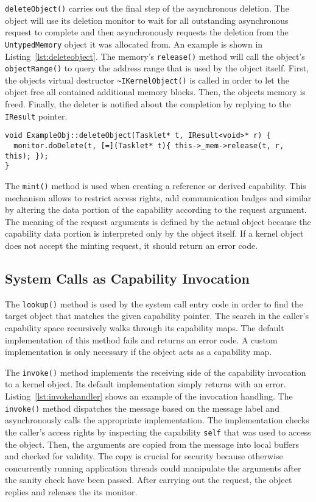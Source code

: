 \texttt{deleteObject()} carries out the final step of the asynchronous
deletion. The object will use its deletion monitor to wait for all
outstanding asynchronous request to complete and then asynchronously
requests the deletion from the \texttt{UntypedMemory} object it was
allocated from. An example is shown in
Listing~\ref{lst:deleteobject}. The memory's \texttt{release()} method
will call the object's \texttt{objectRange()} to query the address
range that is used by the object itself. First, the objects virtual
destructor \texttt{\textasciitilde IKernelObject()} is called in order to let the
object free all contained additional memory blocks. Then, the objects
memory is freed. Finally, the deleter is notified about the completion
by replying to the \texttt{IResult} pointer.

\begin{lstlisting}[float, label=lst:deleteobject, caption=Example handler for asynchronous object deletion.]
void ExampleObj::deleteObject(Tasklet* t, IResult<void>* r) {
  monitor.doDelete(t, [=](Tasklet* t){ this->_mem->release(t, r, this); });
}
\end{lstlisting}

The \texttt{mint()} method is used when creating a reference or derived capability. This mechanism allows to restrict access rights, add communication badges and similar by altering the data portion of the capability according to the request argument. The meaning of the request arguments is defined by the actual object because the capability data portion is interpreted only by the object itself. If a kernel object does not accept the minting request, it should return an error code.

\subsection{System Calls as Capability Invocation}

The \texttt{lookup()} method is used by the system call entry code in
order to find the target object that matches the given capability
pointer. The search in the caller's capability space recursively walks
through its capability maps. The default implementation of this method
fails and returns an error code. A custom implementation is only
necessary if the object acts as a capability map.

The \texttt{invoke()} method implements the receiving side of the
capability invocation to a kernel object. Its default implementation
simply returns with an error. Listing~\ref{lst:invokehandler} shows an
example of the invocation handling. The \texttt{invoke()} method
dispatches the message based on the message label and asynchronously
calls the appropriate implementation. The implementation checks the
caller's access rights by inspecting the capability \texttt{self} that
was used to access the object. Then, the arguments are copied from the
message into local buffers and checked for validity. The copy is
crucial for security because otherwise concurrently running
application threads could manipulate the arguments after the sanity
check have been passed. After carrying out the request, the object
replies and releases the its monitor.

